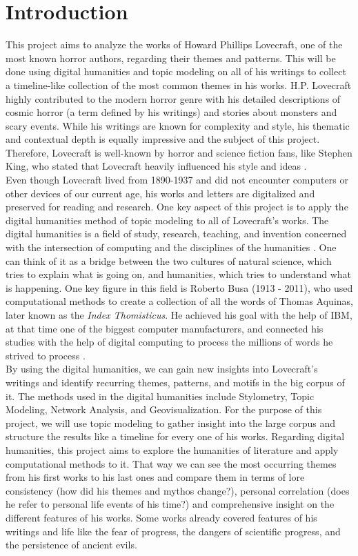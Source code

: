 \section{Introduction}

This project aims to analyze the works of Howard Phillips Lovecraft, one of the most known horror 
authors, regarding their themes and patterns. This will be done using digital humanities and topic 
modeling on all of his writings to collect a timeline-like collection of the most common themes in 
his works. H.P. Lovecraft highly contributed to the modern horror genre with his detailed descriptions 
of cosmic horror (a term defined by his writings) and stories about monsters and scary events. While 
his writings are known for complexity and style, his thematic and contextual depth is equally impressive 
and the subject of this project. Therefore, Lovecraft is well-known by horror and science fiction fans, 
like Stephen King, who stated that Lovecraft heavily influenced his style and ideas \cite{wohleber}.\\

Even though Lovecraft lived from 1890-1937 and did not encounter computers or other devices of our 
current age, his works and letters are digitalized and preserved for reading and research. One key 
aspect of this project is to apply the digital humanities method of topic modeling to all of 
Lovecraft's works. The digital humanities is a field of study, research, teaching, and invention 
concerned with the intersection of computing and the disciplines of the humanities \cite{kirschenbaum}. One can think 
of it as a bridge between the two cultures of natural science, which tries to explain what is going 
on, and humanities, which tries to understand what is happening. One key figure in this field is 
Roberto Busa (1913 - 2011), who used computational methods to create a collection of all the words 
of Thomas Aquinas, later known as the \textit{Index Thomisticus}. He achieved his goal with the help of IBM, 
at that time one of the biggest computer manufacturers, and connected his studies with the help of 
digital computing to process the millions of words he strived to process \cite{nyhan}.\\

By using the digital humanities, we can gain new insights into Lovecraft's writings and identify 
recurring themes, patterns, and motifs in the big corpus of it. The methods used in the digital 
humanities include Stylometry, Topic Modeling, Network Analysis, and Geovisualization. For the 
purpose of this project, we will use topic modeling to gather insight into the large corpus and 
structure the results like a timeline for every one of his works. Regarding digital humanities, 
this project aims to explore the humanities of literature and apply computational methods to it. 
That way we can see the most occurring themes from his first works to his last ones and compare 
them in terms of lore consistency (how did his themes and mythos change?), personal correlation 
(does he refer to personal life events of his time?) and comprehensive insight on the different 
features of his works. Some works already covered features of his writings and life like the fear 
of progress, the dangers of scientific progress, and the persistence of ancient evils.
